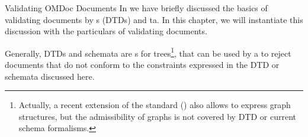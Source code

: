 
\begin{module}[id=validating]
\begin{omgroup}[id=validating]{Validating OMDoc Documents}
In {} we have briefly discussed the basics of validating {\xml}
documents by {s} (DTDs) and {ta}. In
this chapter, we will instantiate this discussion with the particulars of
validating {\omdoc} documents.

Generally, DTDs and schemata are {s} for
trees\footnote{Actually, a recent extension of the {\xml} standard ({\xlink}) also allows
  to express graph structures, but the admissibility of graphs is not covered by DTD or
  current schema formalisms.}, that can be used by a {} to
reject {\xml} documents that do not conform to the constraints expressed in the {\omdoc}
DTD or schemata discussed here.


\end{omgroup}
\end{module}
